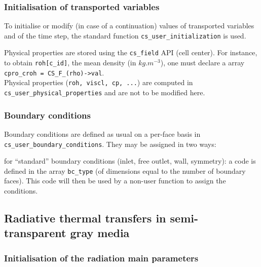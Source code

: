 \subsubsection{Initialisation of transported variables}
To initialise or modify (in case of a continuation) values of transported
variables and of the time step, the standard function \texttt{cs\_user\_initialization} is used.

Physical properties are stored using the \texttt{cs\_field} API (cell center). For instance, to obtain \texttt{roh[c\_id]},
the mean density (in $kg.m^{-3}$), one must declare a array \texttt{cpro\_croh = CS\_F\_(rho)->val}.\\
Physical properties (\texttt{roh, viscl, cp, ...}) are computed in \texttt{cs\_user\_physical\_properties} and are not to be modified here.


\subsubsection{Boundary conditions}
Boundary conditions are defined as usual on a per-face basis in
\texttt{cs\_user\_boundary\_conditions}. They may be assigned in two ways:
\begin{list}{.}{}
\item for ``standard'' boundary conditions (inlet, free outlet, wall, symmetry): a code is defined in the array \texttt{bc\_type} (of dimensions equal to the number of boundary faces). This code will then be used by a non-user function to assign the conditions.
\end{list}

\subsection{Radiative thermal transfers in semi-transparent gray media}
\subsubsection{Initialisation of the radiation main parameters}

